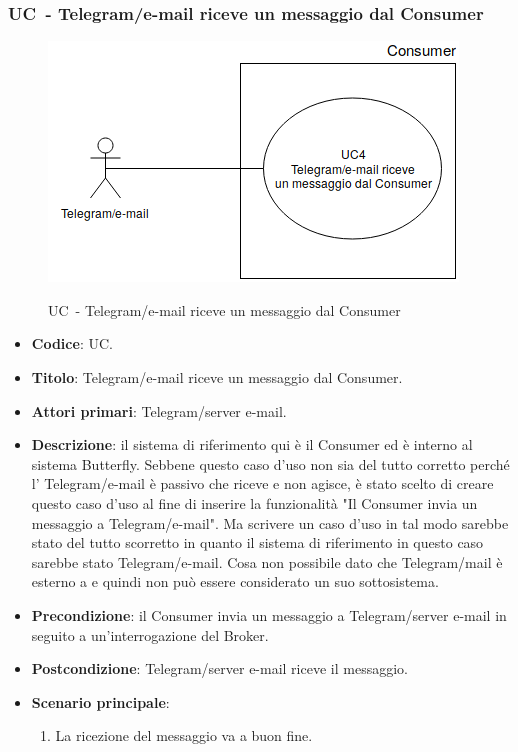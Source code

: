 \subsubsection{UC\theuccount\ - Telegram/e-mail riceve un messaggio dal Consumer}
	\begin{figure}[H]
		\centering
			\includegraphics[width=0.7\columnwidth]{img/UC4.png}\\
		\caption{UC\theuccount\ - Telegram/e-mail riceve un messaggio dal Consumer}
	\end{figure}
	\begin{itemize}
		\item \textbf{Codice}: UC\theuccount.
		\item \textbf{Titolo}: Telegram/e-mail riceve un messaggio dal Consumer.
		\item \textbf{Attori primari}: Telegram/server e-mail.
		\item \textbf{Descrizione}: il sistema di riferimento qui è il Consumer ed è interno al sistema Butterfly.
		Sebbene questo caso d'uso non sia del tutto corretto perché l' Telegram/e-mail è passivo che riceve e non agisce, è stato scelto di creare questo caso d'uso al fine di inserire la funzionalità "Il Consumer invia un messaggio a Telegram/e-mail". Ma scrivere un caso d'uso in tal modo sarebbe stato del tutto scorretto in quanto il sistema di riferimento in questo caso sarebbe stato Telegram/e-mail. Cosa non possibile dato che Telegram/mail è esterno a \progetto e quindi non può essere considerato un suo sottosistema.
		\item \textbf{Precondizione}: il Consumer invia un messaggio a Telegram/server e-mail in seguito a un'interrogazione del Broker.
		\item \textbf{Postcondizione}: Telegram/server e-mail riceve il messaggio.
		\item \textbf{Scenario principale}:
		\begin{enumerate}
			\item La ricezione del messaggio va a buon fine.
		\end{enumerate} 
	\end{itemize}

